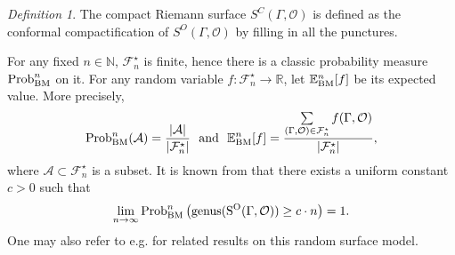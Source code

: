 \documentclass{amsart}
\theoremstyle{plain}
\theoremstyle{definition}
\theoremstyle{remark}
\newtheorem*{Def*}{Definition}
\begin{document}
\begin{Def*}
The compact Riemann surface $S^C(\Gamma,\mathcal{O})$ is defined as the conformal compactification of $S^O(\Gamma,\mathcal{O})$ by filling in all the punctures.
\end{Def*}
For any fixed $n\in\mathbb{N}$, $\mathcal{F}_n^\star$ is finite, hence there is a classic probability measure $\textnormal{Prob}_{\textnormal{BM}}^n$ on it. For any random variable $f:\mathcal{F}_n^\star\to\mathbb{R}$, let $\mathbb{E}_{\textnormal{BM}}^n[f]$ be its expected value. More precisely,
$$\textnormal{Prob}_{\textnormal{BM}}^n(\mathcal{A})=\frac{|\mathcal{A}|}{|\mathcal{F}_n^\star|}\text{ \ and \  }\mathbb{E}_{\textnormal{BM}}^n[f]=\frac{\sum\limits_{(\Gamma,\mathcal{O})\in\mathcal{F}_n^\star}f(\Gamma,\mathcal{O})}{|\mathcal{F}_n^\star|},$$
where $\mathcal{A}\subset \mathcal{F}_n^\star$ is a subset. It is known from \cite[Theorem 2.1 \& Theorem 4.3]{BM04} that there exists a uniform constant $c>0$ such that
\begin{equation}\label{pro-genus}
\lim\limits_{n\to \infty} \textnormal{Prob}_{\textnormal{BM}}^n \left(\mathrm{genus(S^O(\Gamma,\mathcal{O}))}\geq c\cdot n\right)=1.
\end{equation}
One may also refer to e.g. \cite{Ga06,Pe17,BCP21,SW23,LP25,GWW25} for related results on this random surface model.
\end{document}
